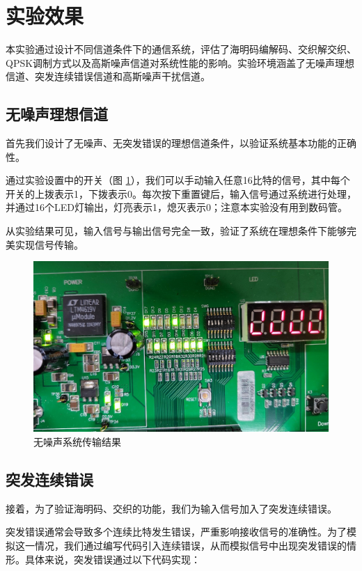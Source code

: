 \section{实验效果}

本实验通过设计不同信道条件下的通信系统，评估了海明码编解码、交织解交织、QPSK调制方式以及高斯噪声信道对系统性能的影响。实验环境涵盖了无噪声理想信道、突发连续错误信道和高斯噪声干扰信道。

\subsection{无噪声理想信道}

首先我们设计了无噪声、无突发错误的理想信道条件，以验证系统基本功能的正确性。

通过实验设置中的开关（图 \ref{fig:result_noise_0}），我们可以手动输入任意16比特的信号，其中每个开关的上拨表示1，下拨表示0。每次按下重置键后，输入信号通过系统进行处理，并通过16个LED灯输出，灯亮表示1，熄灭表示0；注意本实验没有用到数码管。

从实验结果可见，输入信号与输出信号完全一致，验证了系统在理想条件下能够完美实现信号传输。

\begin{figure}[ht]
    \centering
    \includegraphics[width=.8\textwidth]{static/result_noise_0.jpg} 
    \caption{无噪声系统传输结果}\label{fig:result_noise_0}
\end{figure}

\subsection{突发连续错误}

接着，为了验证海明码、交织的功能，我们为输入信号加入了突发连续错误。

突发错误通常会导致多个连续比特发生错误，严重影响接收信号的准确性。为了模拟这一情况，我们通过编写代码引入连续错误，从而模拟信号中出现突发错误的情形。具体来说，突发错误通过以下代码实现：

